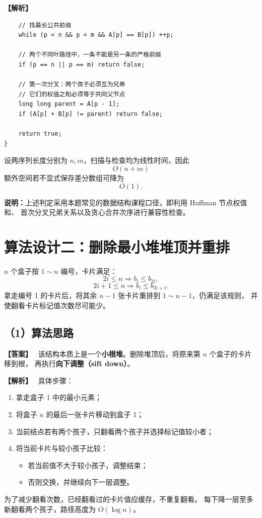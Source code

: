 \documentclass[12pt,a4paper]{ctexart}
\newenvironment{solution}
{\par\noindent\textbf{\color{answerblue}【解析】}\ }
{\par}
\newenvironment{answer}
{\par\noindent\textbf{\color{darkgreen}【答案】}\ }
{\par}
\begin{document}
\begin{solution}
\begin{lstlisting}
    // 找最长公共前缀
    while (p < n && p < m && A[p] == B[p]) ++p;

    // 两个不同叶路径中，一条不能是另一条的严格前缀
    if (p == n || p == m) return false;

    // 第一次分叉：两个孩子必须互为兄弟
    // 它们的权值之和必须等于共同父节点
    long long parent = A[p - 1];
    if (A[p] + B[p] != parent) return false;

    return true;
}
\end{lstlisting}

设两序列长度分别为 $n,m$，扫描与检查均为线性时间，因此
\[
\boxed{O(n+m)}
\]
额外空间若不显式保存差分数组可降为
\[
\boxed{O(1)}.
\]

\textbf{说明：}上述判定采用本题常见的数据结构课程口径，即利用 Huffman 节点权值和、
首次分叉兄弟关系以及贪心合并次序进行兼容性检查。
\end{solution}

\section{算法设计二：删除最小堆堆顶并重排}

$n$ 个盒子按 $1\sim n$ 编号，卡片满足：
\[
2i\le n\Rightarrow b_i\le b_{2i},
\]
\[
2i+1\le n\Rightarrow b_i\le b_{2i+1}.
\]
拿走编号 1 的卡片后，将其余 $n-1$ 张卡片重排到 $1\sim n-1$，仍满足该规则，
并使翻看卡片标记值次数尽可能少。

\subsection*{（1）算法思路}

\begin{answer}
该结构本质上是一个\textbf{小根堆}。删除堆顶后，将原来第 $n$ 个盒子的卡片移到根，
再执行\textbf{向下调整（sift down）}。
\end{answer}

\begin{solution}
具体步骤：

\begin{enumerate}
  \item 拿走盒子 1 中的最小元素；
  \item 将盒子 $n$ 的最后一张卡片移动到盒子 1；
  \item 当前结点若有两个孩子，只翻看两个孩子并选择标记值较小者；
  \item 将当前卡片与较小孩子比较：
  \begin{itemize}
    \item 若当前值不大于较小孩子，调整结束；
    \item 否则交换，并继续向下一层调整。
  \end{itemize}
\end{enumerate}

为了减少翻看次数，已经翻看过的卡片值应缓存，不重复翻看。
每下降一层至多新翻看两个孩子，路径高度为 $O(\log n)$。
\end{solution}
\end{document}
